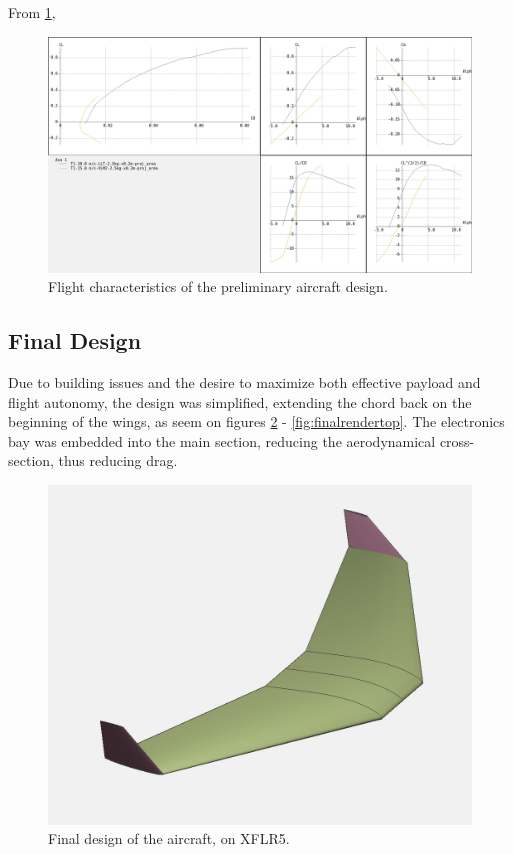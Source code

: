 From \ref{fig:craftpolar}, 	

\begin{figure}
\centering
  \includegraphics[width=\linewidth]{figs/craftpolar.png}
  \caption{Flight characteristics of the preliminary aircraft design.}
  \label{fig:craftpolar}
\end{figure}


\subsection{Final Design}

Due to building issues and the desire to maximize both effective payload and flight autonomy, the design was simplified, extending the chord back on the beginning of the wings, as seem on figures \ref{fig:final} - \ref{fig:finalrendertop}.
The electronics bay was embedded into the main section, reducing the aerodynamical cross-section, thus reducing drag.
	

\begin{figure}
\centering
  \includegraphics[width=\linewidth]{figs/final.png}
  \caption{Final design of the aircraft, on XFLR5.}
  \label{fig:final}
\end{figure}

